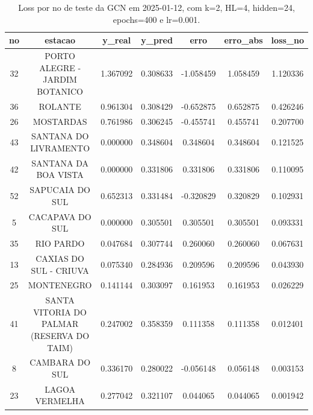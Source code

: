 \begin{table}[h]
\centering
\caption{Loss por no de teste da GCN em 2025-01-12, com k=2, HL=4, hidden=24, epochs=400 e lr=0.001.}
\label{tab:gcn_loss_k2_hl4_h24_e400_d20250112}
\begin{tabular}{ccccccc}
\toprule
no & estacao & y\_real & y\_pred & erro & erro\_abs & loss\_no \\
\midrule
32 & PORTO ALEGRE - JARDIM BOTANICO & 1.367092 & 0.308633 & -1.058459 & 1.058459 & 1.120336 \\
36 & ROLANTE & 0.961304 & 0.308429 & -0.652875 & 0.652875 & 0.426246 \\
26 & MOSTARDAS & 0.761986 & 0.306245 & -0.455741 & 0.455741 & 0.207700 \\
43 & SANTANA DO LIVRAMENTO & 0.000000 & 0.348604 & 0.348604 & 0.348604 & 0.121525 \\
42 & SANTANA DA BOA VISTA & 0.000000 & 0.331806 & 0.331806 & 0.331806 & 0.110095 \\
52 & SAPUCAIA DO SUL & 0.652313 & 0.331484 & -0.320829 & 0.320829 & 0.102931 \\
5 & CACAPAVA DO SUL & 0.000000 & 0.305501 & 0.305501 & 0.305501 & 0.093331 \\
35 & RIO PARDO & 0.047684 & 0.307744 & 0.260060 & 0.260060 & 0.067631 \\
13 & CAXIAS DO SUL - CRIUVA & 0.075340 & 0.284936 & 0.209596 & 0.209596 & 0.043930 \\
25 & MONTENEGRO & 0.141144 & 0.303097 & 0.161953 & 0.161953 & 0.026229 \\
41 & SANTA VITORIA DO PALMAR (RESERVA DO TAIM) & 0.247002 & 0.358359 & 0.111358 & 0.111358 & 0.012401 \\
8 & CAMBARA DO SUL & 0.336170 & 0.280022 & -0.056148 & 0.056148 & 0.003153 \\
23 & LAGOA VERMELHA & 0.277042 & 0.321107 & 0.044065 & 0.044065 & 0.001942 \\
\bottomrule
\end{tabular}
\end{table}
